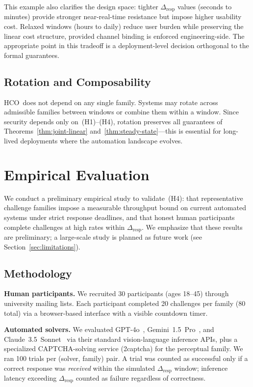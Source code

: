 \documentclass[11pt]{article}
\newcommand{\HCO}{HCO\xspace}
\theoremstyle{remark}
\theoremstyle{plain}
\begin{document}
	This example also clarifies the design space: tighter
	$\Delta_{\mathrm{resp}}$ values (seconds to minutes) provide stronger
	near-real-time resistance but impose higher usability cost. Relaxed
	windows (hours to daily) reduce user burden while preserving the
	linear cost structure, provided channel binding is enforced
	engineering-side. The appropriate point in this tradeoff is a
	deployment-level decision orthogonal to the formal guarantees.
	
	\subsection{Rotation and Composability}
	
	\HCO\ does not depend on any single family. Systems may rotate across
	admissible families between windows or combine them within a window.
	Since security depends only on~(H1)--(H4), rotation preserves all
	guarantees of Theorems~\ref{thm:joint-linear}
	and~\ref{thm:steady-state}---this is essential for long-lived
	deployments where the automation landscape evolves.
	
	
	\section{Empirical Evaluation}
	\label{sec:eval}
	
	We conduct a preliminary empirical study to validate~(H4): that
	representative challenge families impose a measurable throughput bound
	on current automated systems under strict response deadlines, and that
	honest human participants complete challenges at high rates within
	$\Delta_{\mathrm{resp}}$. We emphasize that these results are preliminary;
	a large-scale study is planned as future work
	(see Section~\ref{sec:limitations}).
	
	\subsection{Methodology}
	
	\noindent\textbf{Human participants.}
	We recruited 30 participants (ages 18--45) through university mailing
	lists. Each participant completed 20 challenges per family (80 total)
	via a browser-based interface with a visible countdown timer.
	
	\noindent\textbf{Automated solvers.}
	We evaluated GPT-4o~\cite{openai2023gpt4}, Gemini~1.5~Pro~\cite{geminiteam2023},
	and Claude~3.5~Sonnet~\cite{anthropic2024claude} via their standard
	vision-language inference APIs, plus a specialized CAPTCHA-solving
	service (2captcha) for the perceptual family. We ran 100 trials per
	(solver, family) pair. A trial was counted as successful only if a
	correct response was \emph{received} within the simulated
	$\Delta_{\mathrm{resp}}$ window; inference latency exceeding
	$\Delta_{\mathrm{resp}}$ counted as failure regardless of correctness.
	
\end{document}
